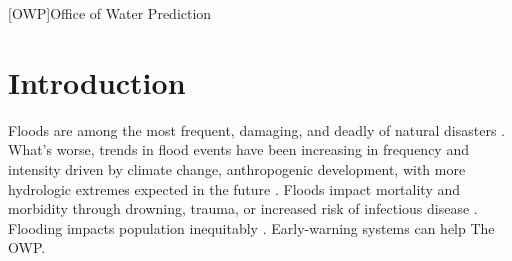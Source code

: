 \documentclass[preprint,12pt]{dependencies/elsarticle}
\begin{document}
\begin{acronym}

[OWP]{Office of Water Prediction}

\end{acronym}

\linenumbers



\section{Introduction}
\label{sec:introduction}
%
Floods are among the most frequent, damaging, and deadly of natural disasters \citet{doocy2013human,stromberg2007natural,kahn2005death}. 
What's worse, trends in flood events have been increasing in frequency and intensity driven by climate change, anthropogenic development, \citet{berz2000flood,mallakpour2015changing,downton2005reanalysis,kunkel1999temporal,pielke2000precipitation,corringham2019effect} with more hydrologic extremes expected in the future \citet{kahn2005death,tabari2020climate,milly2002increasing,wing2018estimates}.
Floods impact mortality and morbidity through drowning, trauma, or increased risk of infectious disease \citet{jonkman2005global,beinin2012medical,alajo2006cholera,french1983mortality}.
Flooding impacts population inequitably \citet{kahn2005death,smiley2021social,stromberg2007natural,jonkman2005global,tellman2020using,tellman2021satellite}.
Early-warning systems can help \citet{stromberg2007natural}
The \ac{OWP}.


\end{document}
